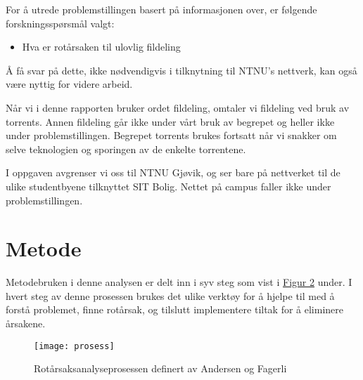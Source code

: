 For å utrede problemstillingen basert på informasjonen over, er følgende forskningsspørsmål valgt: 
\begin{itemize}
    \item Hva er rotårsaken til ulovlig fildeling
\end{itemize}

Å få svar på dette, ikke nødvendigvis i tilknytning til NTNU's nettverk, kan også være nyttig for videre arbeid.

Når vi i denne rapporten bruker ordet fildeling, omtaler vi fildeling ved bruk av torrents. Annen fildeling går ikke under vårt bruk av begrepet og heller ikke under problemstillingen. Begrepet torrents brukes fortsatt når vi snakker om selve teknologien og sporingen av de enkelte torrentene.

I oppgaven avgrenser vi oss til NTNU Gjøvik, og ser bare på nettverket til de ulike studentbyene tilknyttet SIT Bolig. Nettet på campus faller ikke under problemstillingen.

\section{Metode}
Metodebruken i denne analysen er delt inn i syv steg som vist i \hyperref[fig:prosess]{Figur 2} under. I hvert steg av denne prosessen brukes det ulike verktøy for å hjelpe til med å forstå problemet, finne rotårsak, og tilslutt implementere tiltak for å eliminere årsakene. 
\begin{figure}[H]
    \centering
    \texttt{[image: prosess]}
    \label{fig:prosess}
    \caption[Rotårsaksanalyseprosessen]{Rotårsaksanalyseprosessen definert av Andersen og Fagerli}
\end{figure}
